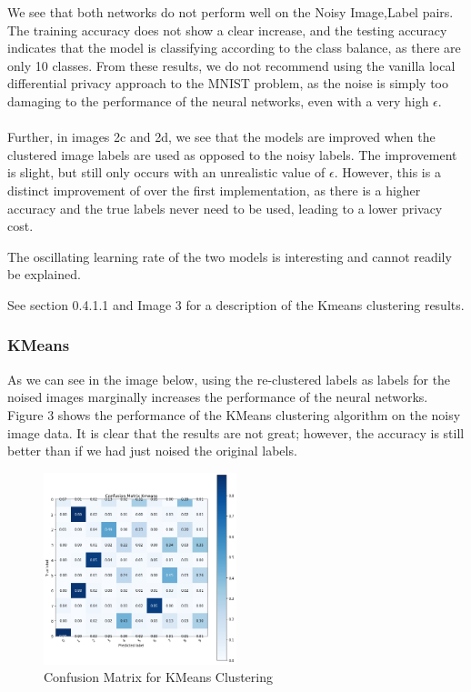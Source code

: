 \documentclass[12pt]{report}
\begin{document}
We see that both networks do not perform well on the Noisy Image,Label pairs. The training accuracy does not show a clear increase, and the testing accuracy indicates that the model is classifying according to the class balance, as there are only 10 classes. From these results, we do not recommend using the vanilla local differential privacy approach to the MNIST problem, as the noise is simply too damaging to the performance of the neural networks, even with a very high $\epsilon$.\\\\
Further, in images 2c and 2d, we see that the models are  improved when the clustered image labels are used as opposed to the noisy labels. The improvement is slight, but still only occurs with an unrealistic value of $\epsilon$. However, this is a distinct improvement of over the first implementation, as there is a higher accuracy and the true labels never need to be used, leading to a lower privacy cost. 

The oscillating learning rate of the two models is interesting and cannot readily be explained. 

See section 0.4.1.1 and Image 3 for a description of the Kmeans clustering results. 


\subsubsection{KMeans}


As we can see in the image below, using the re-clustered labels as labels for the noised images marginally increases the performance of the neural networks. Figure 3 shows the performance of the KMeans clustering algorithm on the noisy image data. It is clear that the results are not great; however, the accuracy is still better than if we had just noised the original labels.


\begin{figure}[H]
  \centering
    \includegraphics[width=0.5\textwidth]{figures/confusion_matrix.png}
      \caption{Confusion Matrix for KMeans Clustering}
\end{figure}
\end{document}
